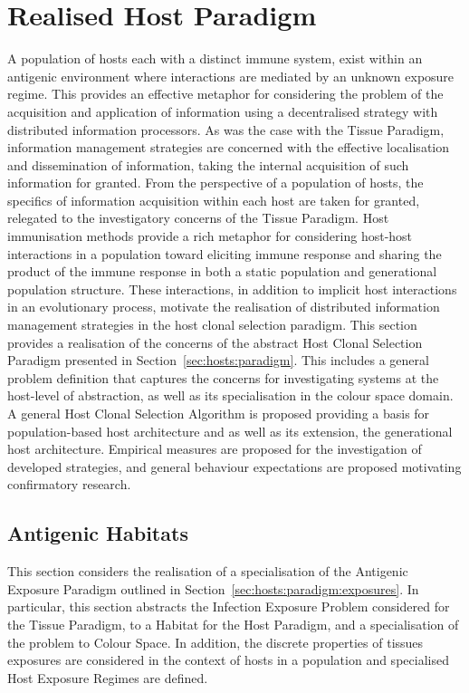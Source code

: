 %
%
\section{Realised Host Paradigm}
\label{subsec:hosts:paradigm:realised}
A population of hosts each with a distinct immune system, exist within an antigenic environment where interactions are mediated by an unknown exposure regime. This provides an effective metaphor for considering the problem of the acquisition and application of information using a decentralised strategy with distributed information processors. As was the case with the Tissue Paradigm, information management strategies are concerned with the effective localisation and dissemination of information, taking the internal acquisition of such information for granted. From the perspective of a population of hosts, the specifics of information acquisition within each host are taken for granted, relegated to the investigatory concerns of the Tissue Paradigm. Host immunisation methods provide a rich metaphor for considering host-host interactions in a population toward eliciting immune response and sharing the product of the immune response in both a static population and generational population structure. These interactions, in addition to implicit host interactions in an evolutionary process, motivate the realisation of distributed information management strategies in the host clonal selection paradigm.
This section provides a realisation of the concerns of the abstract Host Clonal Selection Paradigm presented in Section~\ref{sec:hosts:paradigm}. This includes a general problem definition that captures the concerns for investigating systems at the host-level of abstraction, as well as its specialisation in the colour space domain. A general Host Clonal Selection Algorithm is proposed providing a basis for population-based host architecture and as well as its extension, the generational host architecture. Empirical measures are proposed for the investigation of developed strategies, and general behaviour expectations are proposed motivating confirmatory research. 

%
%
\subsection{Antigenic Habitats}
\label{subsec:hosts:paradigm:realised:problems}
This section considers the realisation of a specialisation of the Antigenic Exposure Paradigm outlined in Section~\ref{sec:hosts:paradigm:exposures}. In particular, this section abstracts the Infection Exposure Problem considered for the Tissue Paradigm, to a Habitat for the Host Paradigm, and a specialisation of the problem to Colour Space. In addition, the discrete properties of tissues exposures are considered in the context of hosts in a population and specialised Host Exposure Regimes are defined.

